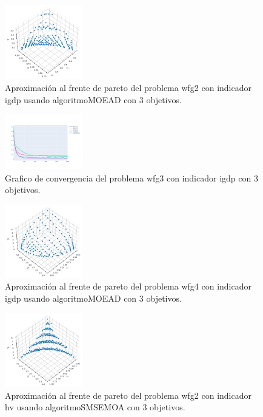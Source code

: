 \documentclass{article}
\begin{document}
\begin{figure}
	\includegraphics[width=0.3\textwidth]{MOEAD_wfg2_igdp_3_fp.png}
	\caption{Aproximación al frente de pareto del problema wfg2 con indicador igdp usando algoritmoMOEAD con 3 objetivos.}
\end{figure}
\begin{figure}
	\includegraphics[width=0.3\textwidth]{wfg3_igdp_3_gc.png}
	\caption{Grafico de convergencia del problema wfg3 con indicador igdp con 3 objetivos.}
\end{figure}
\clearpage
\begin{figure}
	\includegraphics[width=0.3\textwidth]{MOEAD_wfg4_igdp_3_fp.png}
	\caption{Aproximación al frente de pareto del problema wfg4 con indicador igdp usando algoritmoMOEAD con 3 objetivos.}
\end{figure}
\begin{figure}
	\includegraphics[width=0.3\textwidth]{SMSEMOA_wfg2_hv_3_fp.png}
	\caption{Aproximación al frente de pareto del problema wfg2 con indicador hv usando algoritmoSMSEMOA con 3 objetivos.}
\end{figure}
\end{document}
